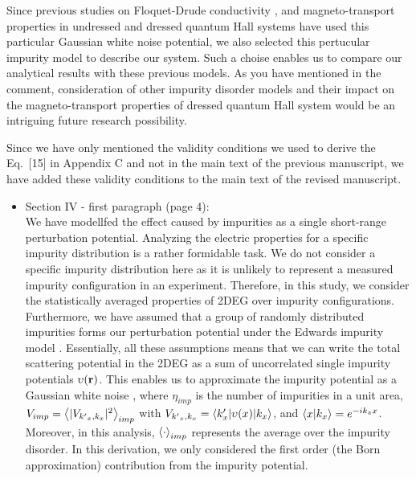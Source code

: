 \documentclass{article}
\begin{document}
Since previous studies on Floquet-Drude conductivity \cite{wackerl20}, and magneto-transport properties in undressed \cite{endo09} and dressed \cite{dini16} quantum Hall systems have used this particular Gaussian white noise potential, we also selected this pertucular impurity model to describe our system. Such a choise enables us to compare our analytical results with these previous models. As you have mentioned in the comment, consideration of other impurity disorder models and their impact on the
magneto-transport properties of dressed quantum Hall system would be an intriguing future research possibility.

Since we have only mentioned the validity conditions we used to derive the Eq.~[15] in Appendix C and not in the main text of the previous manuscript, we have added these validity conditions to the main text of the revised manuscript.

\begin{itemize}
  \item Section IV - first paragraph (page 4):\\
  {\color{Red}
  We have modellfed the effect caused by impurities as a single short-range perturbation potential. Analyzing the electric properties for a specific impurity distribution is a rather formidable task. We do not consider a specific impurity distribution here as it is unlikely to represent a measured impurity configuration in an experiment.
  Therefore, in this study, we consider the statistically averaged properties of 2DEG over impurity configurations.
  Furthermore, we have assumed that a group of randomly distributed impurities forms our perturbation potential under the Edwards impurity model  \cite{akkermans10,wackerl20}.
  Essentially, all these assumptions means that we can write the total scattering potential in the 2DEG as a sum of uncorrelated single impurity potentials $\upsilon(\vb{r})$. This enables us to approximate the impurity potential as a Gaussian white noise \cite{akkermans10,wackerl20},
  where $\eta_{imp}$ is the number of impurities in a unit area, $V_{imp} = \expval{|V_{{k'}_x,k_x}|^2}_{imp}$ with $V_{{k'}_x,k_x} = \mel**{k'_x}{\upsilon(x) }{k_x}$, and $\braket{x}{k_x} = e^{-ik_x x}$.
  Moreover, in this analysis, $\expval{\cdot}_{imp}$ represents the average over the impurity disorder. In this derivation, we only considered the first order (the Born approximation) contribution from the impurity potential.
  }
\end{itemize}
\end{document}
